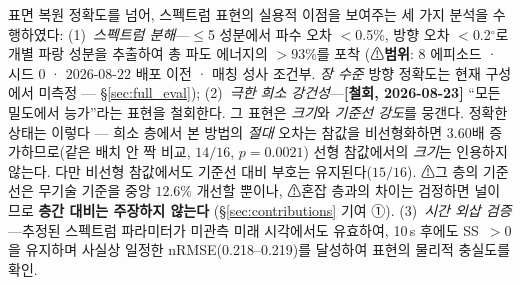 \documentclass[11pt]{report}
\numberwithin{equation}{chapter}
\numberwithin{figure}{chapter}
\numberwithin{table}{chapter}
\begin{document}
표면 복원 정확도를 넘어, 스펙트럼 표현의 실용적 이점을 보여주는
세 가지 분석을 수행하였다:
(1)~\emph{스펙트럼 분해}---$\leq$5 성분에서 파수 오차 $<$0.5\%,
방향 오차 $<$0.2$^\circ$로 개별 파랑 성분을 추출하여
총 파도 에너지의 $>$93\%를 포착
(⚠\textbf{범위}: $8$ 에피소드 · 시드 $0$ · $2026$-$08$-$22$ 배포 이전 · 매칭 성사 조건부.
\emph{장 수준} 방향 정확도는 현재 구성에서 미측정 --- \S\ref{sec:full_eval});
(2)~\emph{극한 희소 강건성}---\textbf{[철회, 2026-08-23]} ``모든 밀도에서 능가''라는
표현을 철회한다. 그 표현은 \emph{크기}와 \emph{기준선 강도}를 뭉갠다.
정확한 상태는 이렇다 --- 희소 층에서 본 방법의 \emph{절대} 오차는 참값을 비선형화하면
$3.60$배 증가하므로(같은 배치 안 짝 비교, $14/16$, $p = 0.0021$)
선형 참값에서의 \emph{크기}는 인용하지 않는다. 다만 비선형 참값에서도
기준선 대비 부호는 유지된다($15/16$). ⚠그 층의 기준선은 무기술 기준을 중앙 $12.6\%$ 개선할 뿐이나,
⚠혼잡 층과의 차이는 검정하면 널이므로 \textbf{층간 대비는 주장하지 않는다}
(\S\ref{sec:contributions} 기여 ①).
(3)~\emph{시간 외삽 검증}---추정된 스펙트럼 파라미터가 미관측 미래 시각에서도
유효하여, 10\,s 후에도 SS~$>0$을 유지하며 사실상 일정한
nRMSE(0.218--0.219)를 달성하여 표현의 물리적 충실도를 확인.
\end{document}
